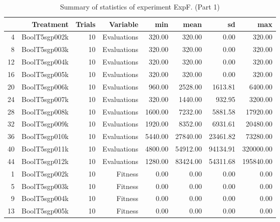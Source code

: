 \begin{table}[ht]
\centering
\begin{tabular}{rrrrrrrr}
  \hline
 & Treatment & Trials & Variable & min & mean & sd & max \\ 
  \hline
4 & BoolT5sgp002k &  10 & Evaluations & 320.00 & 320.00 & 0.00 & 320.00 \\ 
  8 & BoolT5sgp003k &  10 & Evaluations & 320.00 & 320.00 & 0.00 & 320.00 \\ 
  12 & BoolT5sgp004k &  10 & Evaluations & 320.00 & 320.00 & 0.00 & 320.00 \\ 
  16 & BoolT5sgp005k &  10 & Evaluations & 320.00 & 320.00 & 0.00 & 320.00 \\ 
  20 & BoolT5sgp006k &  10 & Evaluations & 960.00 & 2528.00 & 1613.81 & 6400.00 \\ 
  24 & BoolT5sgp007k &  10 & Evaluations & 320.00 & 1440.00 & 932.95 & 3200.00 \\ 
  28 & BoolT5sgp008k &  10 & Evaluations & 1600.00 & 7232.00 & 5881.58 & 17920.00 \\ 
  32 & BoolT5sgp009k &  10 & Evaluations & 1920.00 & 8352.00 & 6931.61 & 20480.00 \\ 
  36 & BoolT5sgp010k &  10 & Evaluations & 5440.00 & 27840.00 & 23461.82 & 73280.00 \\ 
  40 & BoolT5sgp011k &  10 & Evaluations & 4800.00 & 54912.00 & 94134.91 & 320000.00 \\ 
  44 & BoolT5sgp012k &  10 & Evaluations & 1280.00 & 83424.00 & 54311.68 & 195840.00 \\ 
  1 & BoolT5sgp002k &  10 & Fitness & 0.00 & 0.00 & 0.00 & 0.00 \\ 
  5 & BoolT5sgp003k &  10 & Fitness & 0.00 & 0.00 & 0.00 & 0.00 \\ 
  9 & BoolT5sgp004k &  10 & Fitness & 0.00 & 0.00 & 0.00 & 0.00 \\ 
  13 & BoolT5sgp005k &  10 & Fitness & 0.00 & 0.00 & 0.00 & 0.00 \\ 
   \hline
\end{tabular}
\caption{Summary of statistics of experiment ExpF. (Part 1)} 
\end{table}

